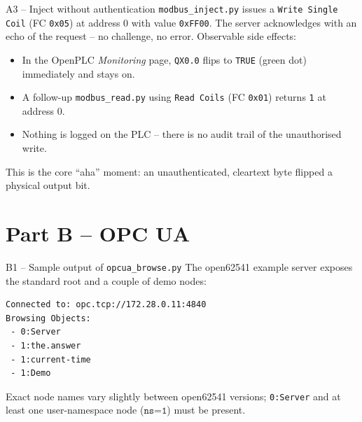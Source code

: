\documentclass[11pt,a4paper]{article}
\begin{document}
\begin{solutionbox}{A3 -- Inject without authentication}
\texttt{modbus\_inject.py} issues a \texttt{Write Single Coil} (FC
\texttt{0x05}) at address 0 with value \texttt{0xFF00}. The server
acknowledges with an echo of the request -- no challenge, no error.
Observable side effects:
\begin{itemize}[leftmargin=*, nosep]
  \item In the OpenPLC \emph{Monitoring} page, \texttt{QX0.0} flips to
        \texttt{TRUE} (green dot) immediately and stays on.
  \item A follow-up \texttt{modbus\_read.py} using \texttt{Read Coils}
        (FC \texttt{0x01}) returns \texttt{1} at address 0.
  \item Nothing is logged on the PLC -- there is no audit trail of the
        unauthorised write.
\end{itemize}
This is the core ``aha'' moment: an unauthenticated, cleartext byte
flipped a physical output bit.
\end{solutionbox}

\section*{Part B -- OPC UA}

\begin{solutionbox}{B1 -- Sample output of \texttt{opcua\_browse.py}}
The open62541 example server exposes the standard root and a couple of
demo nodes:
\begin{lstlisting}
Connected to: opc.tcp://172.28.0.11:4840
Browsing Objects:
 - 0:Server
 - 1:the.answer
 - 1:current-time
 - 1:Demo
\end{lstlisting}
Exact node names vary slightly between open62541 versions; \texttt{0:Server}
and at least one user-namespace node ($\texttt{ns=1}$) must be present.
\end{solutionbox}
\end{document}
